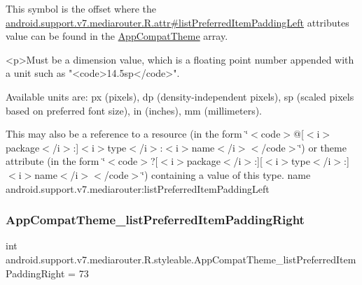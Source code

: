 This symbol is the offset where the \hyperlink{classandroid_1_1support_1_1v7_1_1mediarouter_1_1R_1_1attr_a27c5b6c05830bc20ec3b8aede4cb84b5}{android.\+support.\+v7.\+mediarouter.\+R.\+attr\#list\+Preferred\+Item\+Padding\+Left} attribute\textquotesingle{}s value can be found in the \hyperlink{classandroid_1_1support_1_1v7_1_1mediarouter_1_1R_1_1styleable_a4e3d3900c75d49aeb2f283cac00214d6}{App\+Compat\+Theme} array.

\begin{DoxyVerb}      <p>Must be a dimension value, which is a floating point number appended with a unit such as "<code>14.5sp</code>".
\end{DoxyVerb}
 Available units are\+: px (pixels), dp (density-\/independent pixels), sp (scaled pixels based on preferred font size), in (inches), mm (millimeters). 

This may also be a reference to a resource (in the form \char`\"{}$<$code$>$@\mbox{[}$<$i$>$package$<$/i$>$\+:\mbox{]}$<$i$>$type$<$/i$>$\+:$<$i$>$name$<$/i$>$$<$/code$>$\char`\"{}) or theme attribute (in the form \char`\"{}$<$code$>$?\mbox{[}$<$i$>$package$<$/i$>$\+:\mbox{]}\mbox{[}$<$i$>$type$<$/i$>$\+:\mbox{]}$<$i$>$name$<$/i$>$$<$/code$>$\char`\"{}) containing a value of this type.  name android.\+support.\+v7.\+mediarouter\+:list\+Preferred\+Item\+Padding\+Left \mbox{\label{classandroid_1_1support_1_1v7_1_1mediarouter_1_1R_1_1styleable_ad7f8ba5273c36438148cf9ec4c052103}} 
\subsubsection{\texorpdfstring{App\+Compat\+Theme\+\_\+list\+Preferred\+Item\+Padding\+Right}{AppCompatTheme\_listPreferredItemPaddingRight}}
{\footnotesize\ttfamily int android.\+support.\+v7.\+mediarouter.\+R.\+styleable.\+App\+Compat\+Theme\+\_\+list\+Preferred\+Item\+Padding\+Right = 73\hspace{0.3cm}{\ttfamily [static]}}

